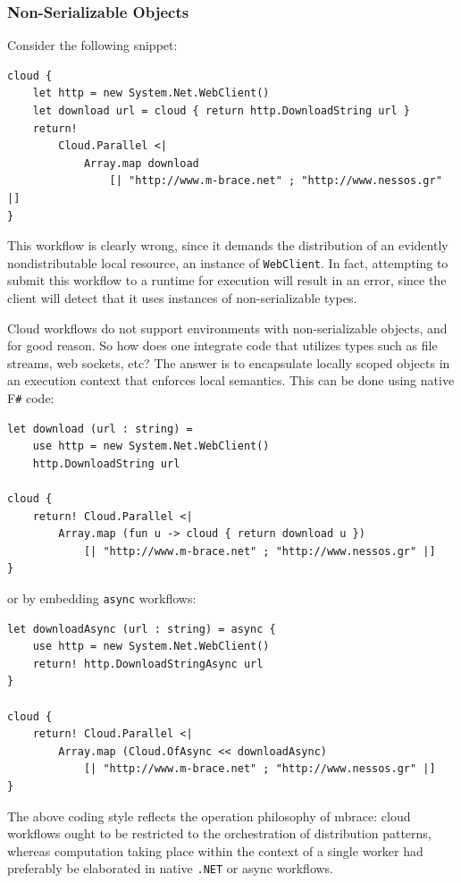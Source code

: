 \documentclass[9pt,a4paper]{article}
\newcommand{\mbrace}{mbrace}
\newcommand{\fsharp}{F\texttt \#}
\newcommand{\dotnet}{\texttt{\hbox{.}NET}}
\begin{document}
\subsubsection*{Non-Serializable Objects}

\noindent Consider the following snippet:
\begin{lstlisting}
cloud {
    let http = new System.Net.WebClient()
    let download url = cloud { return http.DownloadString url }
    return! 
        Cloud.Parallel <| 
            Array.map download 
                [| "http://www.m-brace.net" ; "http://www.nessos.gr" |]
}
\end{lstlisting}
This workflow is clearly wrong, since it demands the distribution of an evidently
nondistributable local resource, an instance of \texttt{WebClient}.
In fact, attempting to submit this workflow to a runtime for execution will result in
an error, since the client will detect that it uses instances of non-serializable 
types.

Cloud workflows do not support environments with non-serializable objects,
and for good reason. So how does one integrate code that utilizes types such
as file streams, web sockets, etc?
%
The answer is to encapsulate locally scoped objects in an execution context
that enforces local semantics. This can be done using native \fsharp{} code:
\begin{lstlisting}
let download (url : string) =
    use http = new System.Net.WebClient()
    http.DownloadString url

cloud {
    return! Cloud.Parallel <|
        Array.map (fun u -> cloud { return download u })
            [| "http://www.m-brace.net" ; "http://www.nessos.gr" |]
}
\end{lstlisting}
or by embedding \texttt{async} workflows:
\begin{lstlisting}
let downloadAsync (url : string) = async {
    use http = new System.Net.WebClient()
    return! http.DownloadStringAsync url
}

cloud {
    return! Cloud.Parallel <|
        Array.map (Cloud.OfAsync << downloadAsync)
            [| "http://www.m-brace.net" ; "http://www.nessos.gr" |]
} 
\end{lstlisting}

The above coding style reflects the operation philosophy of \mbrace:
cloud workflows ought to be restricted to the orchestration of distribution patterns, 
whereas computation taking place within the context of a single worker 
had preferably be elaborated in native \dotnet{} or async workflows.
\end{document}
